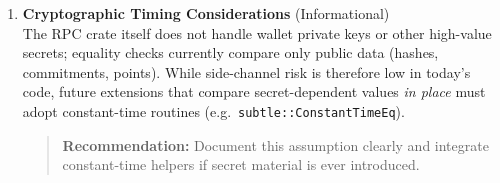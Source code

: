 \documentclass[12pt,a4paper]{article}
\begin{document}
\begin{enumerate}
    \item \textbf{Cryptographic Timing Considerations} (Informational)\\
      The RPC crate itself does not handle wallet private keys or other
      high-value secrets; equality checks currently compare only public data
      (hashes, commitments, points).  While side-channel risk is therefore low in
      today’s code, future extensions that compare secret-dependent values \emph{in
      place} must adopt constant-time routines (e.g.\
      \texttt{subtle::ConstantTimeEq}).
      \begin{quote}
        \textbf{Recommendation:}  Document this assumption clearly and integrate
        constant-time helpers if secret material is ever introduced.
      \end{quote}
\end{enumerate}




\end{document}
